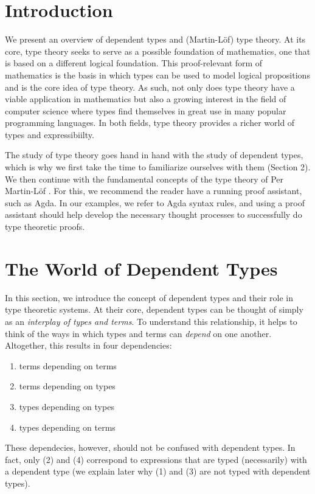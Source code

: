 \documentclass[12pt]{article}
\begin{document}
\maketitle


\section{Introduction}
We present an overview of dependent types and (Martin-L\"of) type theory.
At its core, type theory seeks to serve as a possible foundation of mathematics,
one that is based on a different logical foundation. This proof-relevant
form of mathematics is the basis in which types can be used to model logical
propositions and is the core idea of type theory. As such, not only does type
theory have a viable application in mathematics but also a growing interest
in the field of computer science where types find themselves in great use in
many popular programming languages. In both fields, type theory provides a
richer world of types and expressibiilty.

The study of type theory goes hand in hand with the study of dependent types,
which is why we first take the time to familiarize ourselves with them
(Section 2). We then continue with the fundamental concepts of the type theory of
Per Martin-L\"of \cite{}. For this, we recommend the reader have a running proof
assistant, such as Agda. In our examples, we refer to Agda syntax rules, and
using a proof assistant should help develop the necessary thought processes to
successfully do type theoretic proofs. 

\section{The World of Dependent Types}
In this section, we introduce the concept of dependent types and their role in
type theoretic systems. At their core, dependent types can be thought of simply
as an \textit{interplay of types and terms}. To understand this relationship,
it helps to think of the ways in which types and terms can \textit{depend} on
one another. Altogether, this results in four dependencies:

\begin{enumerate}
\item terms depending on terms
\item terms depending on types
\item types depending on types
\item types depending on terms
\end{enumerate}
These dependecies, however, should not be confused with dependent types.
In fact, only (2) and (4) correspond to expressions that are typed (necessarily)
with a dependent type (we explain later why (1) and (3) are not typed with
dependent types).
\end{document}
